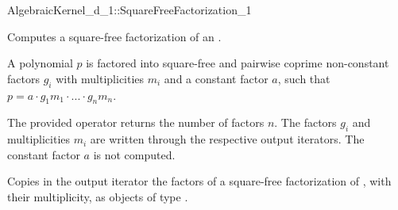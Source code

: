 \begin{ccRefConcept}{AlgebraicKernel_d_1::SquareFreeFactorization_1}

\ccDefinition
Computes a square-free factorization of an
.

A polynomial $p$ is factored into square-free and pairwise 
coprime non-constant factors $g_i$ with multiplicities $m_i$ 
and a constant factor $a$, such that 
$p = a  \cdot  g_1m_1  \cdot  ...  \cdot  g_nm_n$.

The provided operator returns the number of factors $n$.
The factors $g_i$ and multiplicities $m_i$ are written through the 
respective output iterators. 
The constant factor $a$ is not computed. 

\ccRefines 
{} 

\ccOperations
{}

{Copies in the output iterator the factors of a square-free 
factorization of , with their multiplicity, as objects of type 
.}

\ccSeeAlso

\end{ccRefConcept}
